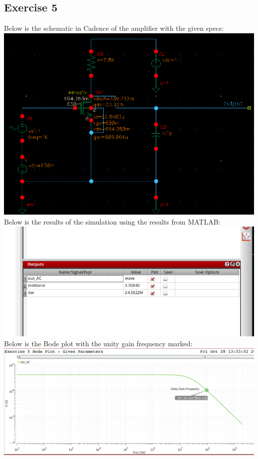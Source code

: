 \documentclass[12pt, fleqn]{article}
\begin{document}
\subsection{Exercise 5}
Below is the schematic in Cadence of the amplifier with the given specs:\\[0.25cm]
\includegraphics[scale=0.25, center]{schem6.PNG}\\[0.25cm]
Below is the results of the simulation using the results from MATLAB:\\[0.25cm]
\includegraphics[scale=0.275, center]{sim_res7.PNG}\\[0.25cm]
Below is the Bode plot with the unity gain frequency marked:\\[0.25cm]
\includegraphics[scale=0.275, center]{bode7.PNG}\\[0.25cm]
\end{document}
